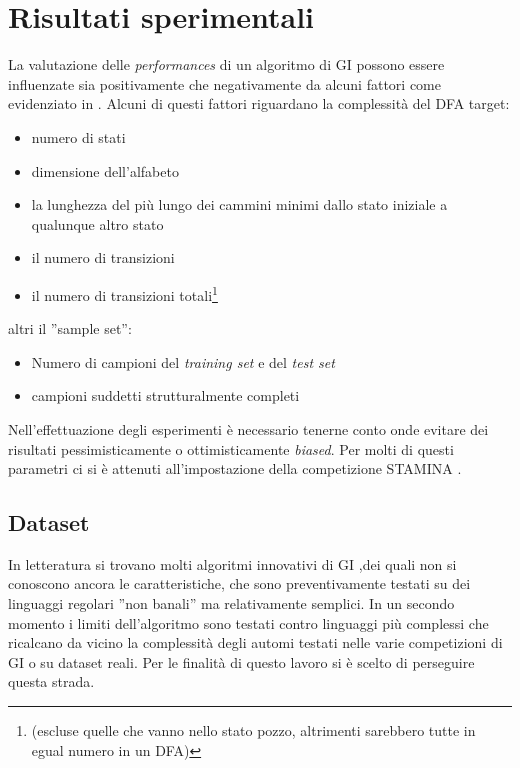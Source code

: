 
\chapter{Risultati sperimentali} %
\label{cap:sette}
La valutazione delle \textit{performances} di un algoritmo di \ac{GI} possono essere influenzate sia positivamente che negativamente da alcuni fattori come  evidenziato in \cite{Stamina10}. Alcuni di questi fattori riguardano la complessità del \ac{DFA} target:
\begin{itemize}
\item numero di stati
\item dimensione dell'alfabeto
\item la lunghezza del più lungo dei cammini minimi dallo stato iniziale a qualunque altro stato
\item il numero di transizioni
\item il numero di transizioni totali\footnote{ (escluse quelle che vanno nello stato pozzo, altrimenti sarebbero tutte in egual numero in un \ac{DFA})}
\end{itemize}

altri il ''sample set'':
\begin{itemize}
\item Numero di campioni del \textit{training set} e del \textit{test set}
\item campioni suddetti strutturalmente completi
\end{itemize} 
Nell'effettuazione degli esperimenti è necessario tenerne conto onde evitare dei risultati pessimisticamente o ottimisticamente \textit{biased}. Per molti di questi parametri ci si è attenuti all'impostazione della competizione STAMINA \cite{Stamina10}.

\section{Dataset}
In letteratura si trovano molti algoritmi innovativi di \ac{GI} ,dei quali non si conoscono ancora le caratteristiche, che sono preventivamente testati su dei linguaggi regolari ''non banali'' ma relativamente semplici. In un secondo momento i limiti dell'algoritmo sono testati contro linguaggi più complessi che ricalcano da vicino la complessità degli automi testati nelle varie competizioni di \ac{GI} o su dataset reali. Per le finalità di questo lavoro si è scelto di perseguire questa strada.

